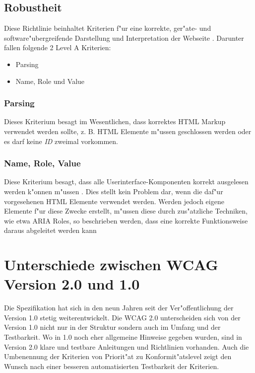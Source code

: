 \documentclass[a4paper,bibtotoc,oneside]{scrbook}
\begin{document}
\subsection{Robustheit}
Diese Richtlinie beinhaltet Kriterien f"ur eine korrekte, ger"ate- und software"ubergreifende Darstellung und Interpretation der Webseite \cite[Abschnitt 4.1]{wcag2}. Darunter fallen folgende 2 Level A Kriterien: 

\begin{itemize}
\item Parsing \cite[Abschnitt 4.1.1]{wcag2}
\item Name, Role und Value \cite[Abschnitt 4.1.2]{wcag2}
\end{itemize}

\subsubsection{Parsing}
Dieses Kriterium besagt im Wesentlichen, dass korrektes HTML Markup verwendet werden sollte, z. B. HTML Elemente m"ussen geschlossen werden oder es darf keine \emph{ID} zweimal vorkommen. \cite[Abschnitt 4.1.1]{wcag2}

\subsubsection{Name, Role, Value}
Diese Kriterium besagt, dass alle Userinterface-Komponenten korrekt ausgelesen werden k"onnen m"ussen \cite[Abschnitt 4.1.2]{wcag2}. Dies stellt kein Problem dar, wenn die daf"ur vorgesehenen HTML Elemente verwendet werden. Werden jedoch eigene Elemente f"ur diese Zwecke erstellt, m"ussen diese durch zus"atzliche Techniken, wie etwa ARIA Roles, so beschrieben werden, dass eine korrekte Funktionsweise daraus abgeleitet werden kann \cite[Abschnitt Intent of this Success Criterion]{understand_412}

\section{Unterschiede zwischen WCAG Version 2.0 und 1.0}
Die Spezifikation hat sich in den neun Jahren seit der Ver"offentlichung der Version 1.0 stetig weiterentwickelt. Die WCAG 2.0 unterscheiden sich von der Version 1.0 nicht nur in der Struktur sondern auch im Umfang und der Testbarkeit. Wo in 1.0 noch eher allgemeine Hinweise gegeben wurden, sind in Version 2.0 klare und testbare Anleitungen und Richtlinien vorhanden. Auch die Umbenennung der Kriterien von Priorit"at zu Konformit"atslevel zeigt den Wunsch nach einer besseren automatisierten Testbarkeit der Kriterien. \cite[Abschnitt Introduction]{wcag2}
\end{document}
